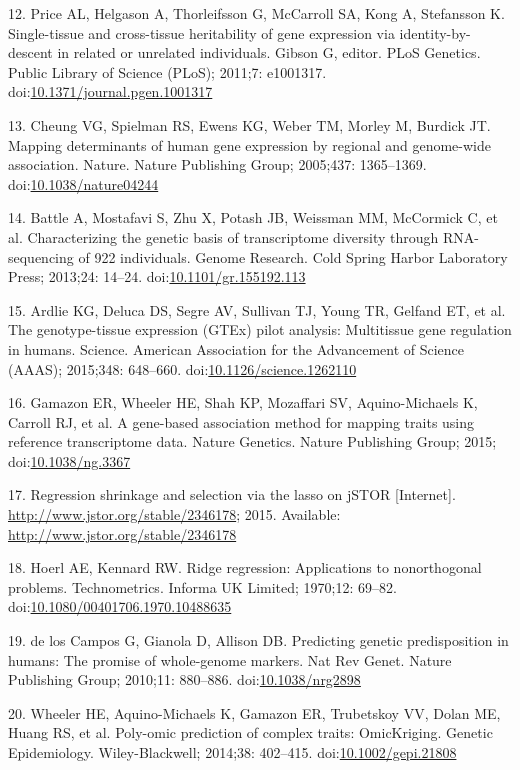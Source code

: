 \documentclass[]{article}
\begin{document}
12. Price AL, Helgason A, Thorleifsson G, McCarroll SA, Kong A,
Stefansson K. Single-tissue and cross-tissue heritability of gene
expression via identity-by-descent in related or unrelated individuals.
Gibson G, editor. PLoS Genetics. Public Library of Science (PLoS);
2011;7: e1001317.
doi:\href{http://dx.doi.org/10.1371/journal.pgen.1001317}{10.1371/journal.pgen.1001317}

13. Cheung VG, Spielman RS, Ewens KG, Weber TM, Morley M, Burdick JT.
Mapping determinants of human gene expression by regional and
genome-wide association. Nature. Nature Publishing Group; 2005;437:
1365--1369.
doi:\href{http://dx.doi.org/10.1038/nature04244}{10.1038/nature04244}

14. Battle A, Mostafavi S, Zhu X, Potash JB, Weissman MM, McCormick C,
et al. Characterizing the genetic basis of transcriptome diversity
through RNA-sequencing of 922 individuals. Genome Research. Cold Spring
Harbor Laboratory Press; 2013;24: 14--24.
doi:\href{http://dx.doi.org/10.1101/gr.155192.113}{10.1101/gr.155192.113}

15. Ardlie KG, Deluca DS, Segre AV, Sullivan TJ, Young TR, Gelfand ET,
et al. The genotype-tissue expression (GTEx) pilot analysis: Multitissue
gene regulation in humans. Science. American Association for the
Advancement of Science (AAAS); 2015;348: 648--660.
doi:\href{http://dx.doi.org/10.1126/science.1262110}{10.1126/science.1262110}

16. Gamazon ER, Wheeler HE, Shah KP, Mozaffari SV, Aquino-Michaels K,
Carroll RJ, et al. A gene-based association method for mapping traits
using reference transcriptome data. Nature Genetics. Nature Publishing
Group; 2015;
doi:\href{http://dx.doi.org/10.1038/ng.3367}{10.1038/ng.3367}

17. Regression shrinkage and selection via the lasso on jSTOR
{[}Internet{]}. \url{http://www.jstor.org/stable/2346178}; 2015.
Available: \url{http://www.jstor.org/stable/2346178}

18. Hoerl AE, Kennard RW. Ridge regression: Applications to
nonorthogonal problems. Technometrics. Informa UK Limited; 1970;12:
69--82.
doi:\href{http://dx.doi.org/10.1080/00401706.1970.10488635}{10.1080/00401706.1970.10488635}

19. {de los Campos} G, Gianola D, Allison DB. Predicting genetic
predisposition in humans: The promise of whole-genome markers. Nat Rev
Genet. Nature Publishing Group; 2010;11: 880--886.
doi:\href{http://dx.doi.org/10.1038/nrg2898}{10.1038/nrg2898}

20. Wheeler HE, Aquino-Michaels K, Gamazon ER, Trubetskoy VV, Dolan ME,
Huang RS, et al. Poly-omic prediction of complex traits: OmicKriging.
Genetic Epidemiology. Wiley-Blackwell; 2014;38: 402--415.
doi:\href{http://dx.doi.org/10.1002/gepi.21808}{10.1002/gepi.21808}
\end{document}
